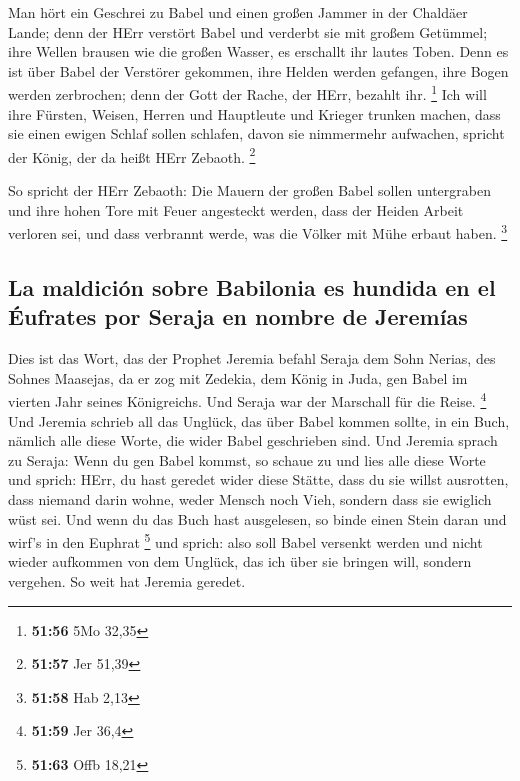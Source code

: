  Man hört ein Geschrei zu Babel und einen großen Jammer
in der Chaldäer Lande;  denn der HErr verstört Babel und
verderbt sie mit großem Getümmel; ihre Wellen brausen wie die großen
Wasser, es erschallt ihr lautes Toben.  Denn es ist über
Babel der Verstörer gekommen, ihre Helden werden gefangen, ihre Bogen
werden zerbrochen; denn der Gott der Rache, der HErr, bezahlt ihr.
\footnote{\textbf{51:56} 5Mo 32,35}  Ich will ihre
Fürsten, Weisen, Herren und Hauptleute und Krieger trunken machen, dass
sie einen ewigen Schlaf sollen schlafen, davon sie nimmermehr aufwachen,
spricht der König, der da heißt HErr Zebaoth. \footnote{\textbf{51:57}
  Jer 51,39}

 So spricht der HErr Zebaoth: Die Mauern der großen Babel
sollen untergraben und ihre hohen Tore mit Feuer angesteckt werden, dass
der Heiden Arbeit verloren sei, und dass verbrannt werde, was die Völker
mit Mühe erbaut haben. \footnote{\textbf{51:58} Hab 2,13}

\hypertarget{la-maldiciuxf3n-sobre-babilonia-es-hundida-en-el-uxe9ufrates-por-seraja-en-nombre-de-jeremuxedas}{%
\subsection{La maldición sobre Babilonia es hundida en el Éufrates por
Seraja en nombre de
Jeremías}\label{la-maldiciuxf3n-sobre-babilonia-es-hundida-en-el-uxe9ufrates-por-seraja-en-nombre-de-jeremuxedas}}

 Dies ist das Wort, das der Prophet Jeremia befahl Seraja
dem Sohn Nerias, des Sohnes Maasejas, da er zog mit Zedekia, dem König
in Juda, gen Babel im vierten Jahr seines Königreichs. Und Seraja war
der Marschall für die Reise. \footnote{\textbf{51:59} Jer 36,4}
 Und Jeremia schrieb all das Unglück, das über Babel
kommen sollte, in ein Buch, nämlich alle diese Worte, die wider Babel
geschrieben sind.  Und Jeremia sprach zu Seraja: Wenn du
gen Babel kommst, so schaue zu und lies alle diese Worte 
und sprich: HErr, du hast geredet wider diese Stätte, dass du sie willst
ausrotten, dass niemand darin wohne, weder Mensch noch Vieh, sondern
dass sie ewiglich wüst sei.  Und wenn du das Buch hast
ausgelesen, so binde einen Stein daran und wirf's in den Euphrat
\footnote{\textbf{51:63} Offb 18,21}  und sprich: also
soll Babel versenkt werden und nicht wieder aufkommen von dem Unglück,
das ich über sie bringen will, sondern vergehen. So weit hat Jeremia
geredet.

